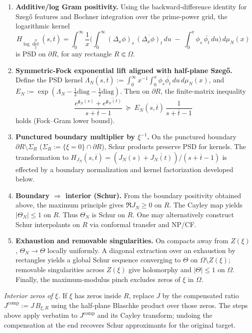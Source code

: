 \documentclass[11pt]{article}
\theoremstyle{definition}
\theoremstyle{remark}
\begin{document}
\begin{enumerate}
  \item \textbf{Additive/log Gram positivity.} Using the backward-difference identity for Szeg\H{o} features and Bochner integration over the prime-power grid, the logarithmic kernel
  \[
    H_{\log\det_2^N}(s,\overline t)
    = \int_0^\infty \frac{1}{x}\Big(\int_0^\infty (\Delta_x\phi)_s\,\overline{(\Delta_x\phi)_t}\,du\; -\; \int_0^x \phi_s\,\overline{\phi_t}\,du\Big)\,d\mu_N(x)
  \]
  is PSD on \(\partial R\), for any rectangle \(R\Subset\Omega\).
  \item \textbf{Symmetric-Fock exponential lift aligned with half-plane Szeg\H{o}.} Define the PSD kernel
  \(\Lambda_N(s,\overline t):=\int_0^\infty x^{-1}\int_0^x \phi_s\overline{\phi_t}\,du\,d\mu_N(x)\), and
  \(E_N:=\exp(\Lambda_N-\tfrac12\mathrm{diag}-\tfrac12\mathrm{diag})\).
  Then on \(\partial R\), the finite-matrix inequality
  \[
    \frac{e^{\mathfrak g_N(s)}+\overline{e^{\mathfrak g_N(t)}}}{s+\overline t-1}\ \succeq\ E_N(s,\overline t)\,\frac{1}{s+\overline t-1}
  \]
  holds (Fock--Gram lower bound).
  \item \textbf{Punctured boundary multiplier by \(\xi^{-1}\).} On the punctured boundary \(\partial R\setminus\Sigma_R\) (\(\Sigma_R:=\{\xi=0\}\cap\partial R\)), Schur products preserve PSD for kernels. The transformation to \(H_{J_N}(s,\overline t)=(J_N(s)+\overline{J_N(t)})/(s+\overline t-1)\) is effected by a boundary normalization and kernel factorization developed below.
  \item \textbf{Boundary \(\Rightarrow\) interior (Schur).} From the boundary positivity obtained above, the maximum principle gives \(\Re J_N\ge 0\) on \(R\). The Cayley map yields \(|\Theta_N|\le 1\) on \(R\). Thus \(\Theta_N\) is Schur on \(R\). One may alternatively construct Schur interpolants on \(R\) via conformal transfer and NP/CF.
  \item \textbf{Exhaustion and removable singularities.} On compacts away from \(Z(\xi)\), \(\Theta_N\to\Theta\) locally uniformly. A diagonal extraction over an exhaustion by rectangles yields a global Schur sequence converging to \(\Theta\) on \(\Omega\setminus Z(\xi)\); removable singularities across \(Z(\xi)\) give holomorphy and \(|\Theta|\le 1\) on \(\Omega\). Finally, the maximum-modulus pinch excludes zeros of \(\xi\) in \(\Omega\).
\end{enumerate}
\noindent
\emph{Interior zeros of \(\xi\).} If \(\xi\) has zeros inside \(R\), replace \(J\) by the compensated ratio \(J^{\mathrm{comp}}:=J\,B_{\xi,R}\) using the half-plane Blaschke product over those zeros. The steps above apply verbatim to \(J^{\mathrm{comp}}\) and its Cayley transform; undoing the compensation at the end recovers Schur approximants for the original target.
\end{document}
